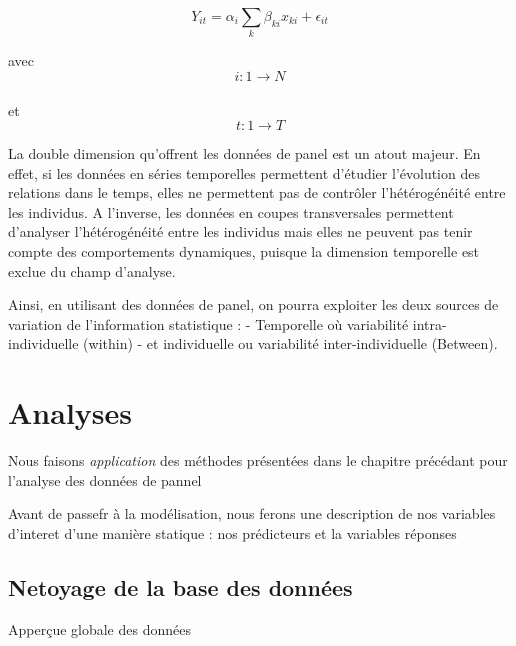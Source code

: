 \documentclass[
]{book}
\begin{document}
\[ Y_{it}= \alpha_i\sum_{k}\beta_{ki}x_{ki}+ \epsilon_{it} \]

avec
\[ i:1 \rightarrow N \]\\
et
\[ t:1 \rightarrow T \]

La double dimension qu'offrent les données de panel est un atout majeur. En effet, si les données en séries temporelles permettent d'étudier l'évolution des relations dans le temps, elles ne permettent pas de contrôler l'hétérogénéité entre les individus. A l'inverse, les données en coupes transversales permettent d'analyser l'hétérogénéité entre les individus mais elles ne peuvent pas tenir compte des comportements dynamiques, puisque la dimension temporelle est exclue du champ d'analyse.

Ainsi, en utilisant des données de panel, on pourra exploiter les deux sources de variation de l'information statistique :
- Temporelle où variabilité intra-individuelle (within)
- et individuelle ou variabilité inter-individuelle (Between).

\hypertarget{analyses}{%
\chapter{Analyses}\label{analyses}}

Nous faisons \emph{application} des méthodes présentées dans le chapitre précédant pour l'analyse des données de pannel

Avant de passefr à la modélisation, nous ferons une description de nos variables d'interet d'une manière statique : nos prédicteurs et la variables réponses

\hypertarget{netoyage-de-la-base-des-donnuxe9es}{%
\section{Netoyage de la base des données}\label{netoyage-de-la-base-des-donnuxe9es}}

Apperçue globale des données
\end{document}
